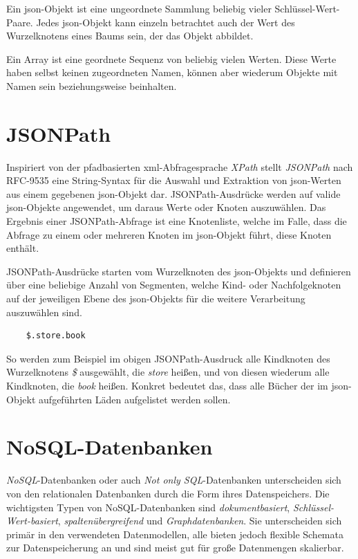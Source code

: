 \documentclass[oneside]{ausarbeitung}
\begin{document}
Ein \ac{json}-Objekt ist eine ungeordnete Sammlung beliebig vieler Schlüssel-Wert-Paare. Jedes \ac{json}-Objekt kann einzeln betrachtet auch der Wert des Wurzelknotens eines Baums sein, der das Objekt abbildet. 
	
Ein Array ist eine geordnete Sequenz von beliebig vielen Werten. Diese Werte haben selbst keinen zugeordneten Namen, können aber wiederum Objekte mit Namen sein beziehungsweise beinhalten.  
	
	
\section{JSONPath}
	
Inspiriert von der pfadbasierten \ac{xml}-Abfragesprache \textit{XPath} stellt \textit{JSONPath} nach RFC-9535 eine String-Syntax für die Auswahl und Extraktion von \ac{json}-Werten aus einem gegebenen \ac{json}-Objekt dar. JSONPath-Ausdrücke werden auf valide \ac{json}-Objekte angewendet, um daraus Werte oder Knoten auszuwählen. Das Ergebnis einer JSONPath-Abfrage ist eine Knotenliste, welche im Falle, dass die Abfrage zu einem oder mehreren Knoten im \ac{json}-Objekt führt, diese Knoten enthält.
	
JSONPath-Ausdrücke starten vom Wurzelknoten des \ac{json}-Objekts und definieren über eine beliebige Anzahl von Segmenten, welche Kind- oder Nachfolgeknoten auf der jeweiligen Ebene des \ac{json}-Objekts für die weitere Verarbeitung auszuwählen sind.
	
\begin{lstlisting}
	$.store.book
\end{lstlisting}
	
So werden zum Beispiel im obigen JSONPath-Ausdruck alle Kindknoten des Wurzelknotens \textit{\$} ausgewählt, die \textit{store} heißen, und von diesen wiederum alle Kindknoten, die \textit{book} heißen. Konkret bedeutet das, dass alle Bücher der im \ac{json}-Objekt aufgeführten Läden aufgelistet werden sollen.
	
	
	
	
\section{NoSQL-Datenbanken}
	
\textit{NoSQL}-Datenbanken oder auch \textit{Not only SQL}-Datenbanken unterscheiden sich von den relationalen Datenbanken durch die Form ihres Datenspeichers. Die wichtigsten Typen von NoSQL-Datenbanken sind \textit{dokumentbasiert}, \textit{Schlüssel-Wert-basiert}, \textit{spaltenübergreifend} und \textit{Graphdatenbanken}. Sie unterscheiden sich primär in den verwendeten Datenmodellen, alle bieten jedoch flexible Schemata zur Datenspeicherung an und sind meist gut für große Datenmengen skalierbar.
	
\end{document}
